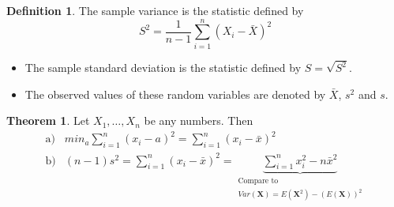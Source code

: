 \documentclass[10pt, twoside, a4paper]{book}
\theoremstyle{definition}
\newtheorem{definition}{Definition}[chapter]
\newtheorem{theorem}{Theorem}[chapter]
\begin{document}
\begin{definition}
The sample variance is the statistic defined by
$$S^2 = \frac{1}{n-1}\sum_{i=1}^n (X_i-\bar X)^2$$
\end{definition}
\begin{itemize}
  \item The sample standard deviation is the statistic defined by $S =
  \sqrt{S^2}$.
  \item The observed values of these random variables are denoted by $\bar X$,
  $s^2$ and $s$.
\end{itemize}
\begin{theorem}
Let $X_1,\ldots,X_n$ be any numbers. Then
\begin{equation*}
\renewcommand{\arraystretch}{1.6}
\begin{array}{lll}
\text{a)} & min_a \sum_{i=1}^n (x_i-a)^2 = \sum_{i=1}^n(x_i-\bar x)^2 \\
\text{b)} & (n-1)s^2 = \sum_{i=1}^n (x_i-\bar x)^2 = \underbrace{\sum_{i=1}^n
x_i^2-n\bar x^2}_{\substack{\text{Compare to} \\ Var(\bm X) = E(\bm
X^2)-(E(\bm X))^2}} %
\\
\end{array}
\end{equation*}
\end{theorem}
\end{document}
